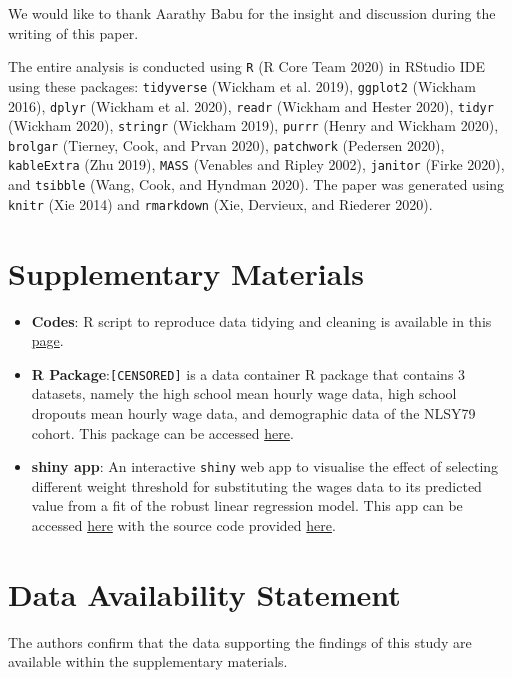 \documentclass{article}
\begin{document}
We would like to thank Aarathy Babu for the insight and discussion during the writing of this paper.

The entire analysis is conducted using \texttt{R} (R Core Team 2020) in RStudio IDE using these packages: \texttt{tidyverse} (Wickham et al. 2019), \texttt{ggplot2} (Wickham 2016), \texttt{dplyr} (Wickham et al. 2020), \texttt{readr} (Wickham and Hester 2020), \texttt{tidyr} (Wickham 2020), \texttt{stringr} (Wickham 2019), \texttt{purrr} (Henry and Wickham 2020), \texttt{brolgar} (Tierney, Cook, and Prvan 2020), \texttt{patchwork} (Pedersen 2020), \texttt{kableExtra} (Zhu 2019), \texttt{MASS} (Venables and Ripley 2002), \texttt{janitor} (Firke 2020), and \texttt{tsibble} (Wang, Cook, and Hyndman 2020). The paper was generated using \texttt{knitr} (Xie 2014) and \texttt{rmarkdown} (Xie, Dervieux, and Riederer 2020).

\hypertarget{supplementary-materials}{%
\section{Supplementary Materials}\label{supplementary-materials}}

\begin{itemize}
\item
  \textbf{Codes}: R script to reproduce data tidying and cleaning is available in this \href{CENSORED/articles/process-data.html}{page}.
\item
  \textbf{R Package}:\texttt{[CENSORED]} is a data container R package that contains 3 datasets, namely the high school mean hourly wage data, high school dropouts mean hourly wage data, and demographic data of the NLSY79 cohort. This package can be accessed \href{CENSORED}{here}.
\item
  \textbf{shiny app}: An interactive \texttt{shiny} web app to visualise the effect of selecting different weight threshold for substituting the wages data to its predicted value from a fit of the robust linear regression model. This app can be accessed \href{CENSORED}{here} with the source code provided \href{CENSORED/tree/master/app}{here}.
\end{itemize}

\hypertarget{data-availability-statement}{%
\section{Data Availability Statement}\label{data-availability-statement}}

The authors confirm that the data supporting the findings of this study are available within the supplementary materials.
\end{document}
